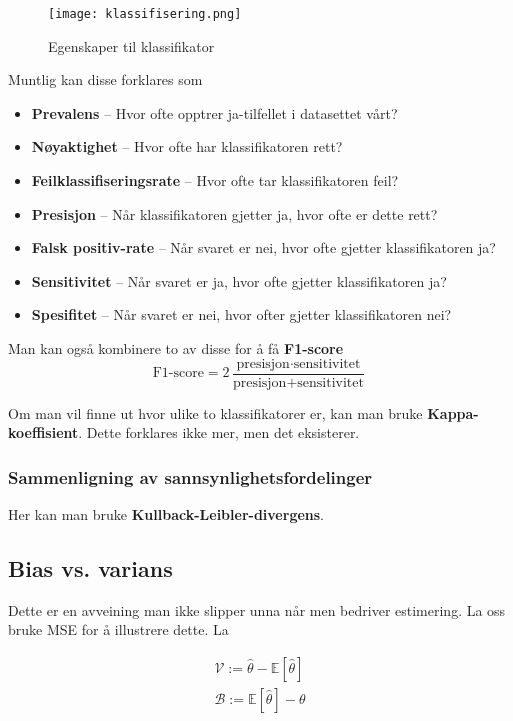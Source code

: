 \documentclass[12pt]{article}
\begin{document}
\begin{figure}[h]
\centering
\texttt{[image: klassifisering.png]}
\caption{Egenskaper til klassifikator}
\label{fig:klassifisering}
\end{figure}

Muntlig kan disse forklares som
\begin{itemize}
\item \textbf{Prevalens} -- Hvor ofte opptrer ja-tilfellet i datasettet vårt?
\item \textbf{Nøyaktighet} -- Hvor ofte har klassifikatoren rett?
\item \textbf{Feilklassifiseringsrate} -- Hvor ofte tar klassifikatoren feil?
\item \textbf{Presisjon} -- Når klassifikatoren gjetter ja, hvor ofte er dette rett?
\item \textbf{Falsk positiv-rate} -- Når svaret er nei, hvor ofte gjetter klassifikatoren ja?
\item \textbf{Sensitivitet} -- Når svaret er ja, hvor ofte gjetter klassifikatoren ja?
\item \textbf{Spesifitet} -- Når svaret er nei, hvor ofter gjetter klassifikatoren nei?
\end{itemize}

Man kan også kombinere to av disse for å få \textbf{F1-score}
\begin{equation}
\textrm{F1-score} = 2 \frac{\textrm{presisjon} \cdot \textrm{
sensitivitet}}{\textrm{presisjon} + \textrm{
sensitivitet}}
\end{equation}

Om man vil finne ut hvor ulike to klassifikatorer er, kan man bruke \textbf{Kappa-koeffisient}. Dette forklares ikke mer, men det eksisterer.

\subsubsection{Sammenligning av sannsynlighetsfordelinger}
Her kan man bruke \textbf{Kullback-Leibler-divergens}.

\subsection{Bias vs. varians}
Dette er en avveining man ikke slipper unna når men bedriver estimering. La oss bruke MSE for å illustrere dette. La 

\begin{equation}
\begin{array}{l}{\mathcal{V}:=\widehat{\theta}-\mathbb{E}[\widehat{\theta}]} \\ {\mathcal{B}:=\mathbb{E}[\widehat{\theta}]-\theta}\end{array}
\end{equation}
\end{document}
